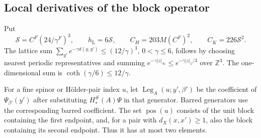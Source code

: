 \documentclass[11pt,letterpaper,reqno]{amsart}
\newcommand{\Z}{\mathbb Z}
\begin{document}
\subsection{Local derivatives of the block operator}

Put
\[
 \mathcal S=C^F(24/\gamma^F)^3,\qquad
 h_{\mathrm L}=6\mathcal S,\qquad
 C_H=203M(C^F)^2,\qquad C_K=226\mathcal S^2.
\]
The lattice sum
$\sum_{y'}e^{-\gamma d(y,y')}\le(12/\gamma)^3$,
$0<\gamma\le6$, follows by choosing nearest periodic
representatives and summing
$e^{-\gamma|z|_\infty}\le e^{-\gamma|z|_1/3}$ over
$\Z^3$. The one-dimensional sum is
$\coth(\gamma/6)\le12/\gamma$.

For a fine spinor or Hölder-pair index $u$, let
$\operatorname{Leg}_A(u;y',\beta')$ be the coefficient
of $\Psi_{\beta'}(y')$ after substituting
$H_*^\#(A)\Psi$ in that generator. Barred generators
use the corresponding barred coefficient.
The set $\operatorname{pos}(u)$ consists of the unit
block containing the first endpoint, and, for a
pair with $d_X(x,x')\ge1$, also the block
containing its second endpoint. Thus it has at
most two elements.
\end{document}
